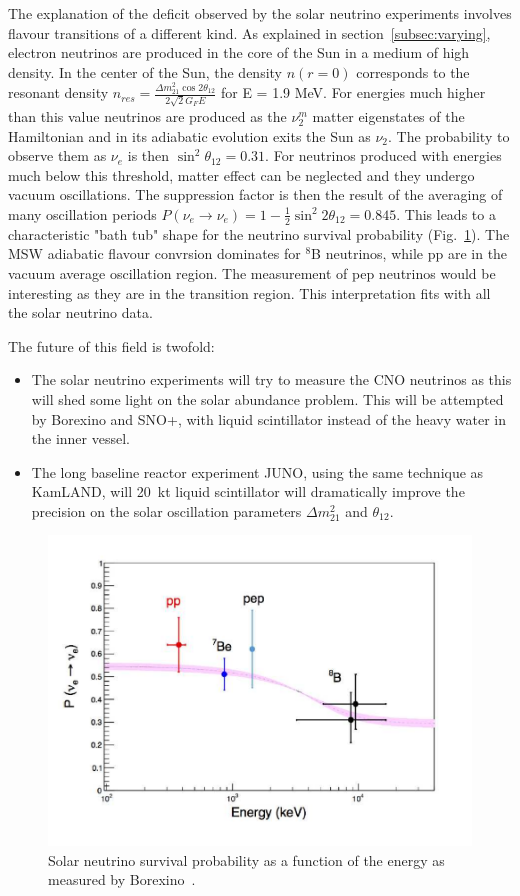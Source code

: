 The explanation of the deficit observed by the solar neutrino experiments involves flavour transitions of a different kind. As explained in section~\ref{subsec:varying}, electron neutrinos are produced in the core of the Sun in a medium of high density. 
In the center of the Sun, the density $n(r=0)$ corresponds to the resonant density $ n_{res}= \frac{\Delta m^2_{21} \cos 2 \theta_{12}}{ 2 \sqrt{2}G_F E}$ for E = 1.9 MeV. For energies much higher than this value
neutrinos are produced as the $ \nu^m_2$ matter eigenstates of the Hamiltonian and in its adiabatic evolution exits the Sun as $\nu_2$. The probability to observe them as $\nu_e$ is then $\sin^2 \theta_{12}= 0.31$. For neutrinos produced with energies much below this threshold, matter effect can be neglected and they undergo vacuum oscillations. The suppression factor is then the result of the averaging of many oscillation periods    
$ P({\nu}_e \rightarrow {\nu}_e ) = 1 - \frac{1}{2} \sin^2 2 \theta_{12}=0.845$. 
This leads to a characteristic "bath tub" shape for the neutrino survival probability (Fig.~\ref{fig:sol-bor}). The MSW adiabatic flavour convrsion dominates for $^8$B neutrinos, while pp are in the vacuum average oscillation region. The measurement of pep neutrinos would be interesting as they are in the transition region.
This interpretation fits with all the solar neutrino data. 

The future of this field is twofold:
\begin{itemize}
\item The solar neutrino experiments will try to measure the CNO neutrinos as this will shed some light on the solar abundance problem. This will be attempted by Borexino and SNO+, with liquid scintillator instead of the heavy water in the inner vessel.
\item The long baseline reactor experiment JUNO, using the same technique as KamLAND, will 20~kt liquid scintillator will dramatically improve the precision on the solar oscillation parameters  $\Delta m^2_{21}$ and $\theta_{12}$.
\end{itemize}


\begin{figure}[htbp]
\centering
\includegraphics[width=0.6\linewidth]{figures/derbin_fig5c.pdf}
  \caption{
  Solar neutrino survival probability as a function of the energy as measured by Borexino~\cite{Derbin:2016cfw}.
}
 \label{fig:sol-bor}
 \end{figure}
